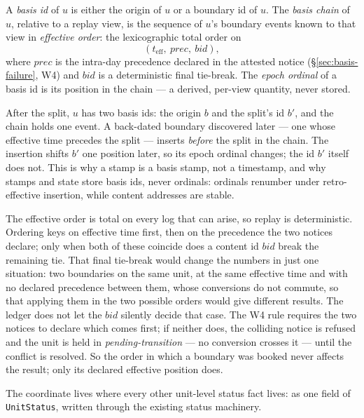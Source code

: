 \begin{definition}
\label{def:basis-id}
A \emph{basis id} of $u$ is either the origin of $u$ or a boundary id
of $u$. The \emph{basis chain} of $u$, relative to a replay view, is the sequence of
$u$'s boundary events known to that view in \emph{effective order}: the lexicographic
total order on
\[
(t_{\mathrm{eff}},\ \mathit{prec},\ \mathit{bid}),
\]
where $\mathit{prec}$ is the intra-day precedence declared in the attested notice
(\S\ref{sec:basis-failure}, W4) and $\mathit{bid}$ is a deterministic final tie-break.
The \emph{epoch ordinal} of a basis id is its position in the chain --- a derived,
per-view quantity, never stored.
\end{definition}

After the split, $u$ has two basis ids: the origin $b$ and the split's id $b'$,
and the chain holds one event. A back-dated boundary discovered later --- one
whose effective time precedes the split --- inserts \emph{before} the split in
the chain. The insertion shifts $b'$ one position later, so its epoch ordinal
changes; the id $b'$ itself does not. This is why a stamp is a basis stamp, not
a timestamp, and why stamps and state store basis ids, never ordinals: ordinals
renumber under retro-effective insertion, while content addresses are stable.

The effective order is total on every log that can arise, so replay is deterministic.
Ordering keys on effective time first, then on the precedence the two notices declare;
only when both of these coincide does a content id $\mathit{bid}$ break the remaining
tie. That final tie-break would change the numbers in just one situation: two boundaries
on the same unit, at the same effective time and with no declared precedence between
them, whose conversions do not commute, so that applying them in the two possible orders
would give different results. The ledger does not let the $\mathit{bid}$ silently decide
that case.
The W4 rule requires the two notices to declare which comes first; if neither does, the
colliding notice is refused and the unit is held in \emph{pending-transition} --- no
conversion crosses it --- until the conflict is resolved. So the order in which a
boundary was booked never affects the result; only its declared effective position
does.

The coordinate lives where every other unit-level status fact lives: as one field of
\texttt{UnitStatus}, written through the existing status machinery.

